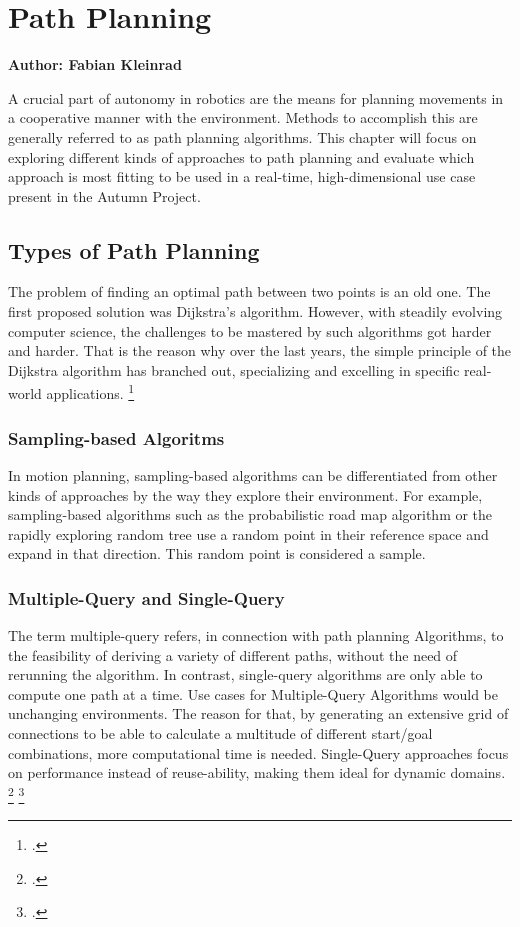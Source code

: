 \chapter{Path Planning}
\label{chapter:path_planning}

\textbf{Author: Fabian Kleinrad} 

A crucial part of autonomy in robotics are the means for planning movements in a cooperative manner with the environment. Methods to accomplish this are generally referred to as path planning algorithms. This chapter will focus on exploring different kinds of approaches to path planning and evaluate which approach is most fitting to be used in a real-time, high-dimensional use case present in the Autumn Project.


\section{Types of Path Planning}

The problem of finding an optimal path between two points is an old one.
The first proposed solution was Dijkstra's algorithm. However, with steadily evolving computer science, the challenges to be mastered by such algorithms got harder and harder. That is the reason why over the last years, the simple principle of the Dijkstra algorithm has branched out, specializing and excelling in specific real-world applications.
\footcite{Pan2020}

\subsection{Sampling-based Algoritms}

In motion planning, sampling-based algorithms can be differentiated from other kinds of approaches by the way they explore their environment. For example, sampling-based algorithms such as the probabilistic road map algorithm or the rapidly exploring random tree use a random point in their reference space and expand in that direction. This random point is considered a sample.

\subsection{Multiple-Query and Single-Query}

The term multiple-query refers, in connection with path planning Algorithms, to the feasibility of deriving a variety of different paths, without the need of rerunning the algorithm. In contrast, single-query algorithms are only able to compute one path at a time.\newline
Use cases for Multiple-Query Algorithms would be unchanging environments. The reason for that, by generating an extensive grid of connections to be able to calculate a multitude of different start/goal combinations, more computational time is needed.\newline
Single-Query approaches focus on performance instead of reuse-ability, making them ideal for dynamic domains. 
\footcite{Bekris2003}
\footcite{stackexchangeMultiSingleQuery2019}

